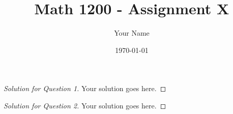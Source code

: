 \documentclass[12pt,letterpaper,reqno]{amsart}
\title{Math 1200 - Assignment X}
\author{Your Name}
\date{\today}
\newtheorem{question}{Question}
\begin{document}
\maketitle                      %


\begin{proof}[Solution for Question 1]
  Your solution goes here.
\end{proof}


\begin{proof}[Solution for Question 2]
  Your solution goes here.
\end{proof}
\end{document}
